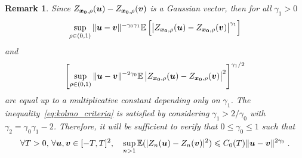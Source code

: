 \documentclass{elsarticle}
\newtheorem{remark}{Remark}
\begin{document}
\begin{remark}\label{rem:gaussian_moment}
Since $Z_{\bm{x_0},\rho}(\bm{u})-Z_{\bm{x_0},\rho}(\bm{v})$ is a Gaussian vector, then for all $\gamma_1>0$
\[
\sup_{\rho\in (0,1)}\|\bm{u}-\bm{v}\|^{-\gamma_0\gamma_1}\mathbb{E}\left[\left|Z_{\bm{x_0},\rho}(\bm{u})-Z_{\bm{x_0},\rho}(\bm{v})\right|^{\gamma_1}\right]
\]
and
\[
\left[\sup_{\rho\in (0,1)}\|\bm{u}-\bm{v}\|^{-2\gamma_0}\mathbb{E}\left|Z_{\bm{x_0},\rho}(\bm{u})-Z_{\bm{x_0},\rho}(\bm{v})\right|^{2}\right]^{\gamma_1/2}
\]
are equal up to a multiplicative constant depending only on $\gamma_1$. The inequality~\eqref{eq:kolmo_criteria} is satisfied by considering $\gamma_1>2/\gamma_0$ with $\gamma_2=\gamma_0\gamma_1-2$. Therefore, it will be sufficient to verify that $0\leq \gamma_0\leq 1$ such that
\begin{equation}\label{eq:kolmo_criteria0}
\forall T>0, \, \forall \bm{u}, \bm{v}\in [-T,T]^{2},\quad \sup\limits_{n>1}\mathbb{E}(|Z_n(\bm{u})-Z_n(\bm{v})|^{2})\leqslant C_{0}(T)\lVert \bm{u}-\bm{v}\rVert^{2\gamma_0}\;.
\end{equation}
\end{remark}
\end{document}
